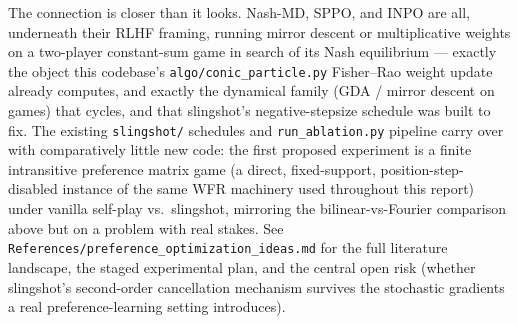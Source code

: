 \documentclass[11pt]{article}
\begin{document}
The connection is closer than it looks. Nash-MD, SPPO, and INPO are all,
underneath their RLHF framing, running mirror descent or multiplicative
weights on a two-player constant-sum game in search of its Nash
equilibrium --- exactly the object this codebase's
\texttt{algo/conic\_particle.py} Fisher--Rao weight update already computes,
and exactly the dynamical family (GDA / mirror descent on games) that
cycles, and that slingshot's negative-stepsize schedule was built to fix.
The existing \texttt{slingshot/} schedules and \texttt{run\_ablation.py}
pipeline carry over with comparatively little new code: the first proposed
experiment is a finite intransitive preference matrix game (a direct,
fixed-support, position-step-disabled instance of the same WFR machinery
used throughout this report) under vanilla self-play vs.\ slingshot, mirroring
the bilinear-vs-Fourier comparison above but on a problem with real stakes.
See \texttt{References/preference\_optimization\_ideas.md} for the full
literature landscape, the staged experimental plan, and the central open
risk (whether slingshot's second-order cancellation mechanism survives the
stochastic gradients a real preference-learning setting introduces).
\end{document}
